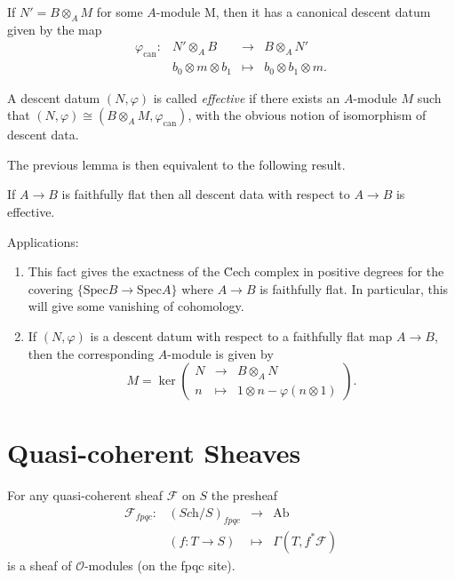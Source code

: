 \noindent
If $N' = B \otimes_A M$ for some $A$-module M, then it has a canonical descent
datum given by the map
$$
\begin{matrix}
\varphi_\text{can}: & N' \otimes_A B & \to & B \otimes_A N' \\
& b_0 \otimes m \otimes b_1 & \mapsto & b_0 \otimes b_1 \otimes m.
\end{matrix}
$$

\begin{definition}
\label{definition-effective-modules}
A descent datum $(N,\varphi)$ is called {\it effective} if there exists an
$A$-module $M$ such that $(N,\varphi) \cong (B\otimes_A M,
\varphi_\text{can})$, with the obvious notion of isomorphism of descent data.
\end{definition}

\noindent
The previous lemma is then equivalent to the following result.

\begin{theorem}
\label{theorem-descent-modules}
If $A \to B$ is faithfully flat then all descent data with respect to $A\to B$
is effective.
\end{theorem}

\begin{remarks}
\label{remarks-theorem-modules-exactness}
Applications:
\begin{enumerate}
\item
This fact gives the exactness of the \u Cech complex in positive degrees for
the covering $\{ \text{Spec} B \to \text{Spec} A\}$ where $A \to B$ is
faithfully flat. In particular, this will give some vanishing of cohomology.
\item
If $(N,\varphi)$ is a descent datum with respect to a faithfully flat map
$A \to B$, then the corresponding $A$-module is given by
$$
M = \ker \left(
\begin{matrix}
N & \longrightarrow & B\otimes_A N \\
n & \longmapsto & 1 \otimes n - \varphi(n\otimes 1)
\end{matrix}
\right).
$$
\end{enumerate}
\end{remarks}




\section{Quasi-coherent Sheaves}
\label{section-quasi-coherent}

\begin{proposition}
\label{proposition-quasi-coherent-sheaf-fpqc}
For any quasi-coherent sheaf $\mathcal{F}$ on $S$ the presheaf
$$
\begin{matrix}
\mathcal{F}_{fpqc} : & (\textit{Sch}/S)_{fpqc} & \to & \text{Ab}\\
& (f: T \to S) &\mapsto & \Gamma(T, f^*\mathcal{F})
\end{matrix}
$$
is a sheaf of $\mathcal{O}$-modules (on the fpqc site).
\end{proposition}


